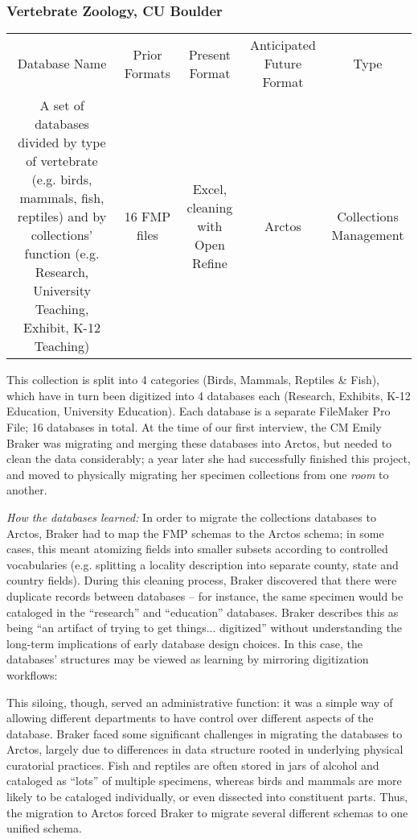 \subsubsection{Vertebrate Zoology, CU Boulder}

\begin{tabular}{ c c c c c } 
    Database Name & Prior Formats & Present Format & Anticipated Future Format & Type \\ 
    A set of databases divided by type of vertebrate (e.g. birds, mammals, fish, reptiles) and by collections' function (e.g. Research, University Teaching, Exhibit, K-12 Teaching) & 16 FMP files & Excel, cleaning with Open Refine & Arctos & Collections Management \\ 
\end{tabular}

This collection is split into 4 categories (Birds, Mammals, Reptiles & Fish), which have in turn been digitized into 4 databases each (Research, Exhibits, K-12 Education, University Education). Each database is a separate FileMaker Pro File; 16 databases in total.  At the time of our first interview, the CM Emily Braker was migrating and merging these databases into Arctos, but needed to clean the data considerably; a year later she had successfully finished this project, and moved to physically migrating her specimen collections from one \textit{room} to another.

\textit{How the databases learned:} In order to migrate the collections databases to Arctos, Braker had to map the FMP schemas to the Arctos schema; in some cases, this meant atomizing fields into smaller subsets according to controlled vocabularies (e.g. splitting a locality description into separate county, state and country fields).  During this cleaning process, Braker discovered that there were duplicate records between databases -- for instance, the same specimen would be cataloged in the “research” and “education” databases.  Braker describes this as being “an artifact of trying to get things... digitized” without understanding the long-term implications of early database design choices. In this case, the databases' structures may be viewed as learning by mirroring digitization workflows: 

This siloing, though, served an administrative function: it was a simple way of allowing different departments to have control over different aspects of the database.  Braker faced some significant challenges in migrating the databases to Arctos, largely due to differences in data structure rooted in underlying physical curatorial practices.  Fish and reptiles are often stored in jars of alcohol and cataloged as “lots” of multiple specimens, whereas birds and mammals are more likely to be cataloged individually, or even dissected into constituent parts.  Thus, the migration to Arctos forced Braker to migrate several different schemas to one unified schema.

